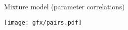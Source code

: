 \begin{frame}{Mixture model (parameter correlations)}
	
	\begin{center}
		\texttt{[image: gfx/pairs.pdf]}
	\end{center}
	
\end{frame}
